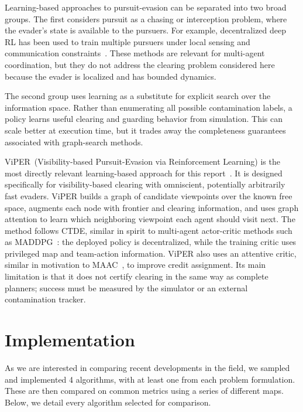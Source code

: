 \documentclass[conference]{IEEEtran}
\begin{document}
Learning-based approaches to pursuit-evasion can be separated into two broad groups.
The first considers pursuit as a chasing or interception problem, where the evader's state is available to the pursuers.
For example, decentralized deep RL has been used to train multiple pursuers under local sensing and communication constraints~\cite{de2021decentralized}.
These methods are relevant for multi-agent coordination, but they do not address the clearing problem considered here because the evader is localized and has bounded dynamics.

The second group uses learning as a substitute for explicit search over the information space.
Rather than enumerating all possible contamination labels, a policy learns useful clearing and guarding behavior from simulation.
This can scale better at execution time, but it trades away the completeness guarantees associated with graph-search methods.

ViPER~(Visibility-based Pursuit-Evasion via Reinforcement Learning) is the most directly relevant learning-based approach for this report~\cite{wang2024viper}.
It is designed specifically for visibility-based clearing with omniscient, potentially arbitrarily fast evaders.
ViPER builds a graph of candidate viewpoints over the known free space, augments each node with frontier and clearing information, and uses graph attention to learn which neighboring viewpoint each agent should visit next.
The method follows CTDE, similar in spirit to multi-agent actor-critic methods such as MADDPG~\cite{lowe2017multiagent}: the deployed policy is decentralized, while the training critic uses privileged map and team-action information.
ViPER also uses an attentive critic, similar in motivation to MAAC~\cite{iqbal2019actor}, to improve credit assignment.
Its main limitation is that it does not certify clearing in the same way as complete planners; success must be measured by the simulator or an external contamination tracker.


\section{Implementation}\label{sec:algo}
As we are interested in comparing recent developments in the field, we sampled and implemented 4 algorithms, with at least one from each problem formulation.
These are then compared on common metrics using a series of different maps.
Below, we detail every algorithm selected for comparison.
\end{document}
